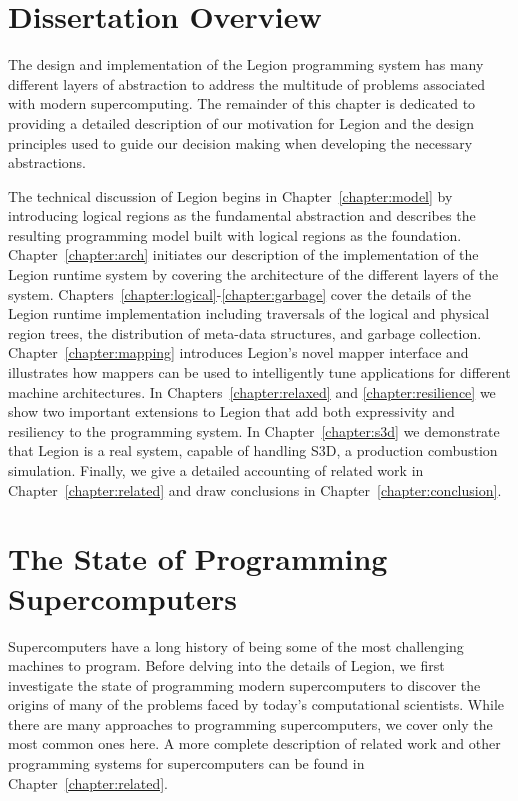 \section{Dissertation Overview}
\label{sec:overview}

The design and implementation of the Legion programming
system has many different layers of abstraction to address
the multitude of problems associated with modern supercomputing.
The remainder of this chapter is dedicated to 
providing a detailed description of our motivation for Legion 
and the design principles used to guide our decision making
when developing the necessary abstractions. 

The technical discussion of Legion begins in Chapter~\ref{chapter:model}
by introducing logical regions as the fundamental abstraction 
and describes the resulting programming model built 
with logical regions as the foundation.
Chapter~\ref{chapter:arch} initiates our description of the
implementation of the Legion runtime system by covering
the architecture of the different layers of the system. 
Chapters~\ref{chapter:logical}-\ref{chapter:garbage} cover
the details of the Legion runtime implementation including traversals
of the logical and physical region trees, the distribution
of meta-data structures, and garbage collection. 
Chapter~\ref{chapter:mapping} introduces Legion's novel
mapper interface and illustrates how mappers can be
used to intelligently tune applications for different
machine architectures. In Chapters~\ref{chapter:relaxed}
and \ref{chapter:resilience} we show two important
extensions to Legion that add both expressivity and 
resiliency to the programming system. In 
Chapter~\ref{chapter:s3d} we demonstrate that Legion
is a real system, capable of handling S3D, a production
combustion simulation. Finally, we give a detailed
accounting of related work in Chapter~\ref{chapter:related}
and draw conclusions in Chapter~\ref{chapter:conclusion}.

\section{The State of Programming Supercomputers}
\label{sec:programming}

Supercomputers have a long history of being some of
the most challenging machines to program. Before 
delving into the details of Legion, we first investigate
the state of programming modern supercomputers to
discover the origins of many of the problems faced
by today's computational scientists.  While there are many 
approaches to programming supercomputers, we cover
only the most common ones here.  A more complete description
of related work and other programming systems for
supercomputers can be found in Chapter~\ref{chapter:related}.

